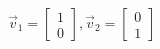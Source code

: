\documentclass[preview]{standalone}
\begin{document}
\begin{align*}
\vec{v}_1 = \begin{bmatrix} 1 \\ 0 \end{bmatrix}, \vec{v}_2 = \begin{bmatrix} 0 \\ 1 \end{bmatrix}
\end{align*}
\end{document}
